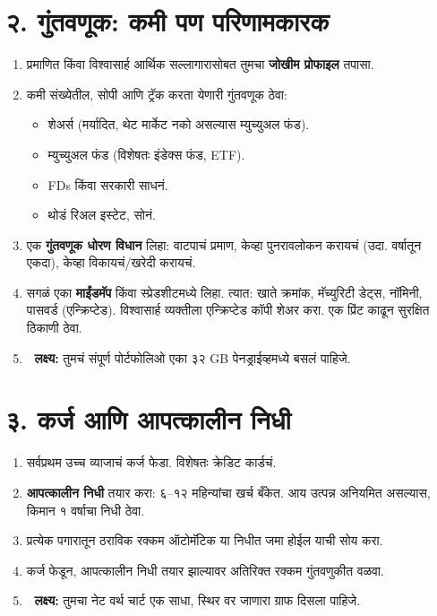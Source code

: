 \section*{२. गुंतवणूक: कमी पण परिणामकारक}
\begin{enumerate}
\item प्रमाणित किंवा विश्वासार्ह आर्थिक सल्लागारासोबत  
तुमचा \textbf{जोखीम प्रोफाइल} तपासा.  

\item कमी संख्येतील, सोपी आणि ट्रॅक करता येणारी गुंतवणूक ठेवा:  
\begin{itemize}
\item शेअर्स (मर्यादित, थेट मार्केट नको असल्यास म्युच्युअल फंड).  
\item म्युच्युअल फंड (विशेषतः इंडेक्स फंड, ETF).  
\item FDs किंवा सरकारी साधनं.  
\item थोडं रिअल इस्टेट, सोनं.  
\end{itemize}

\item एक \textbf{गुंतवणूक धोरण विधान} लिहा:  
वाटपाचं प्रमाण, केव्हा पुनरावलोकन करायचं (उदा. वर्षातून एकदा),  
केव्हा विकायचं/खरेदी करायचं.  

\item सगळं एका \textbf{माईंडमॅप} किंवा स्प्रेडशीटमध्ये लिहा.  
त्यात: खाते क्रमांक, मॅच्युरिटी डेट्स, नॉमिनी, पासवर्ड (एन्क्रिप्टेड).  
विश्वासार्ह व्यक्तीला एन्क्रिप्टेड कॉपी शेअर करा.  
एक प्रिंट काढून सुरक्षित ठिकाणी ठेवा.  

\item 🎯 \textbf{लक्ष्य:} तुमचं संपूर्ण पोर्टफोलिओ एका ३२ GB पेनड्राईव्हमध्ये बसलं पाहिजे.  
\end{enumerate}

\section*{३. कर्ज आणि आपत्कालीन निधी}
\begin{enumerate}
\item सर्वप्रथम उच्च व्याजाचं कर्ज फेडा.  
विशेषतः क्रेडिट कार्डचं.  

\item \textbf{आपत्कालीन निधी} तयार करा:  
६–१२ महिन्यांचा खर्च बँकेत.  
आय उत्पन्न अनियमित असल्यास, किमान १ वर्षाचा निधी ठेवा.  

\item प्रत्येक पगारातून ठराविक रक्कम ऑटोमॅटिक या निधीत जमा होईल याची सोय करा.  

\item कर्ज फेडून, आपत्कालीन निधी तयार झाल्यावर  
अतिरिक्त रक्कम गुंतवणुकीत वळवा.  

\item 🎯 \textbf{लक्ष्य:} तुमचा नेट वर्थ चार्ट एक साधा, स्थिर वर जाणारा ग्राफ दिसला पाहिजे.  
\end{enumerate}


